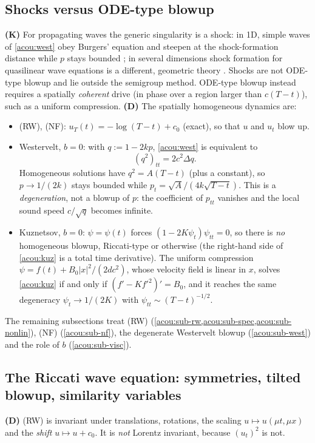 \subsection{Shocks versus ODE-type blowup}
\label{acou:sub-which}
\textbf{(K)} For propagating waves the generic singularity is a shock: in
1D, simple waves of \eqref{acou:west} obey Burgers' equation and steepen at
the shock-formation distance while $p$ stays bounded
\cite{HamiltonBlackstock1998}; in several dimensions shock formation for
quasilinear wave equations is a different, geometric theory
\cite{Christodoulou2007}. %
Shocks are not ODE-type blowup and lie outside the
semigroup method. ODE-type blowup instead requires a spatially
\emph{coherent} drive (in phase over a region larger than $c(T-t)$), such as
a uniform compression. \textbf{(D)} The spatially homogeneous dynamics are:
\begin{itemize}[nosep]
\item (RW), (NF): $u_T(t)=-\log(T-t)+c_0$ (exact), so that $u$ and $u_t$ blow up.
\item Westervelt, $b=0$: with $q:=1-2kp$, \eqref{acou:west} is equivalent to
  \begin{equation}\label{acou:qeq}
    (q^2)_{tt}=2c^2\Delta q .
  \end{equation}
  Homogeneous solutions have $q^2=A(T-t)$ (plus a constant), so
  $p\to1/(2k)$ stays bounded while $p_t=\sqrt A/(4k\sqrt{T-t})$. This is a
  \emph{degeneration}, not a blowup of $p$: the coefficient of $p_{tt}$
  vanishes and the local sound speed $c/\sqrt q$ becomes infinite.
\item Kuznetsov, $b=0$: $\psi=\psi(t)$ forces $(1-2K\psi_t)\psi_{tt}=0$, so
  there is \emph{no} homogeneous blowup, Riccati-type or otherwise (the
  right-hand side of \eqref{acou:kuz} is a total time derivative). The
  uniform compression $\psi=f(t)+B_0|x|^2/(2dc^2)$, whose velocity field is
  linear in $x$, solves \eqref{acou:kuz} if and only if
  $(f'-Kf'^2)'=B_0$, and it reaches the same degeneracy $\psi_t\to1/(2K)$
  with $\psi_{tt}\sim(T-t)^{-1/2}$.
\end{itemize}
The remaining subsections treat (RW) (\cref{acou:sub-rw,acou:sub-spec,acou:sub-nonlin}),
(NF) (\cref{acou:sub-nf}), the degenerate Westervelt blowup
(\cref{acou:sub-west}) and the role of $b$ (\cref{acou:sub-visc}).

\subsection{The Riccati wave equation: symmetries, tilted blowup, similarity variables}
\label{acou:sub-rw}
\textbf{(D)} (RW) is invariant under translations, rotations, the scaling
$u\mapsto u(\mu t,\mu x)$ and the \emph{shift} $u\mapsto u+c_0$. It is
\emph{not} Lorentz invariant, because $(u_t)^2$ is not.


